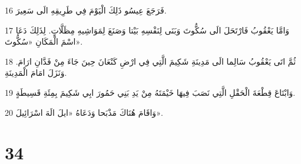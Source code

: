 \par 16 فَرَجَعَ عِيسُو ذَلِكَ الْيَوْمَ فِي طَرِيقِهِ الَى سَعِيرَ.
\par 17 وَامَّا يَعْقُوبُ فَارْتَحَلَ الَى سُكُّوتَ وَبَنَى لِنَفْسِهِ بَيْتا وَصَنَعَ لِمَوَاشِيهِ مِظَلَّاتٍ. لِذَلِكَ دَعَا اسْمَ الْمَكَانِ «سُكُّوتَ».
\par 18 ثُمَّ اتَى يَعْقُوبُ سَالِما الَى مَدِينَةِ شَكِيمَ الَّتِي فِي ارْضِ كَنْعَانَ حِينَ جَاءَ مِنْ فَدَّانِ ارَامَ. وَنَزَلَ امَامَ الْمَدِينَةِ.
\par 19 وَابْتَاعَ قِطْعَةَ الْحَقْلِ الَّتِي نَصَبَ فِيهَا خَيْمَتَهُ مِنْ يَدِ بَنِي حَمُورَ ابِي شَكِيمَ بِمِئَةِ قَسِيطَةٍ.
\par 20 وَاقَامَ هُنَاكَ مَذْبَحا وَدَعَاهُ «ايلَ الَهَ اسْرَائِيلَ».

\chapter{34}

